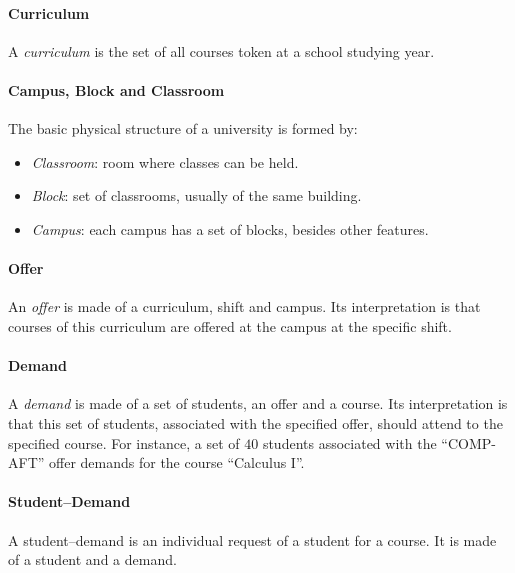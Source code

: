 \paragraph{Curriculum}
\label{defcurric}

A \textit{curriculum} is the set of all courses token at a school studying year.


\paragraph{Campus, Block and Classroom}
\label{defclassroom}

The basic physical structure of a university is formed by:
\begin{itemize}
\item \textit{Classroom}: room where classes can be held.
\item \textit{Block}: set of classrooms, usually of the same building.
\item \textit{Campus}: each campus has a set of blocks, besides other features.
\end{itemize}


\paragraph{Offer}
\label{defoffer}
 
An \textit{offer} is made of a curriculum, shift and campus. Its interpretation is that courses of this curriculum are offered at the campus at the specific shift.


\paragraph{Demand}
 \label{defdem}

A \textit{demand} is made of a set of students, an offer and a course. Its interpretation is that this set of students, associated with the specified offer, should attend to the specified course.
For instance, a set of $40$ students associated with the ``COMP-AFT'' offer demands for the course ``Calculus I''.


\paragraph{Student--Demand}
\label{defstdem}

A student--demand is an individual request of a student for a course. It is made of a student and a demand.



